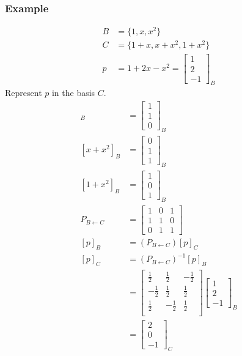 \documentclass{math}
\begin{document}
\subsubsection*{Example}
\begin{align*}
  B &= \{1,x,x^2\} \\
  C &= \{1+x,x+x^2,1+x^2\} \\
  p &= 1+2x-x^2 = \begin{bmatrix}1 \\ 2 \\ -1\end{bmatrix}_B
\end{align*}
Represent \( p \) in the basis \( C \).
\begin{align*}
  [1+x]_B &= \begin{bmatrix}1 \\ 1 \\ 0\end{bmatrix}_B \\
  [x+x^2]_B &= \begin{bmatrix}0 \\ 1 \\ 1\end{bmatrix}_B \\
  [1+x^2]_B &= \begin{bmatrix}1 \\ 0 \\ 1\end{bmatrix}_B \\
  P_{B\leftarrow C} &= \begin{bmatrix}
    1 & 0 & 1 \\
    1 & 1 & 0 \\
    0 & 1 & 1
  \end{bmatrix} \\
  [p]_B &= (P_{B\leftarrow C})[p]_C \\
  [p]_C &= (P_{B\leftarrow C})^{-1}[p]_B \\
  &= \begin{bmatrix}
    \frac{1}{2} & \frac{1}{2} & -\frac{1}{2} \\
    -\frac{1}{2} & \frac{1}{2} & \frac{1}{2} \\
    \frac{1}{2} & -\frac{1}{2} & \frac{1}{2} \\
  \end{bmatrix}\begin{bmatrix}1 \\ 2 \\ -1\end{bmatrix}_B \\
  &= \begin{bmatrix}2 \\ 0 \\ -1\end{bmatrix}_C
\end{align*}
\end{document}

